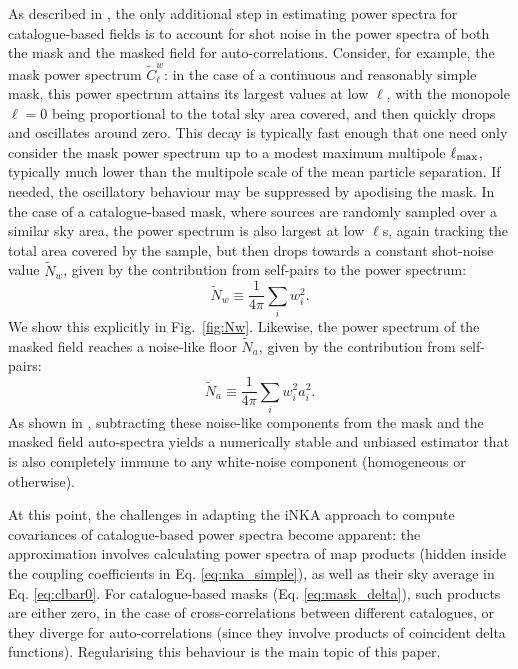 \documentclass[%
 reprint,
superscriptaddress,
nofootinbib,
 amsmath,amssymb,
 aps,
 prd,
]{revtex4-2}
\begin{document}
    As described in \cite{2407.21013}, the only additional step in estimating power spectra for catalogue-based fields is to account for shot noise in the power spectra of both the mask and the masked field for auto-correlations. Consider, for example, the mask power spectrum $\tilde{C}_\ell^w$: in the case of a continuous and reasonably simple mask, this power spectrum attains its largest values at low $\ell$, with the monopole $\ell=0$ being proportional to the total sky area covered, and then quickly drops and oscillates around zero. This decay is typically fast enough that one need only consider the mask power spectrum up to a modest maximum multipole $\ell_{\rm max}$, typically much lower than the multipole scale of the mean particle separation. If needed, the oscillatory behaviour may be suppressed by apodising the mask. In the case of a catalogue-based mask, where sources are randomly sampled over a similar sky area, the power spectrum is also largest at low $\ell$s, again tracking the total area covered by the sample, but then drops towards a constant shot-noise value $\tilde{N}_w$, given by the contribution from self-pairs to the power spectrum:
    \begin{equation}\label{eq:Nw}
      \tilde{N}_w\equiv\frac{1}{4\pi}\sum_iw_i^2.
    \end{equation}
    We show this explicitly in Fig.~\ref{fig:Nw}. Likewise, the power spectrum of the masked field reaches a noise-like floor $\tilde{N}_a$, given by the contribution from self-pairs:
    \begin{equation}\label{eq:Na}
      \tilde{N}_a\equiv\frac{1}{4\pi}\sum_iw_i^2a_i^2.
    \end{equation}
    As shown in \cite{2407.21013,2408.16903}, subtracting these noise-like components from the mask and the masked field auto-spectra yields a numerically stable and unbiased estimator that is also completely immune to any white-noise component (homogeneous or otherwise).

    At this point, the challenges in adapting the iNKA approach to compute covariances of catalogue-based power spectra become apparent: the approximation involves calculating power spectra of map products (hidden inside the coupling coefficients in Eq. \ref{eq:nka_simple}), as well as their sky average in Eq. \ref{eq:clbar0}. For catalogue-based masks (Eq. \ref{eq:mask_delta}), such products are either zero, in the case of cross-correlations between different catalogues, or they diverge for auto-correlations (since they involve products of coincident delta functions). Regularising this behaviour is the main topic of this paper.
\end{document}
